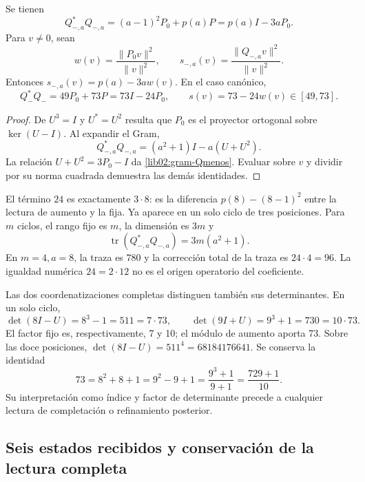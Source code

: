 \begin{theorem}
\label{lib02:gram-ternario}
Se tienen
\begin{equation}
 Q_{-,a}^*Q_{-,a}
 =(a-1)^2P_0+p(a)P=p(a)I-3aP_0.
 \label{lib02:gram-Qmenos}
\end{equation}
Para \(v\ne0\), sean
\[
 w(v)=\frac{\|P_0v\|^2}{\|v\|^2},\qquad
 s_{-,a}(v)=\frac{\|Q_{-,a}v\|^2}{\|v\|^2}.
\]
Entonces \(s_{-,a}(v)=p(a)-3aw(v)\). En el caso canónico,
\begin{equation}
 Q_-^*Q_-=49P_0+73P=73I-24P_0,
 \qquad s(v)=73-24w(v)\in[49,73].
 \label{lib02:73-24w}
\end{equation}
\end{theorem}
\begin{proof}
De \(U^3=I\) y \(U^*=U^2\) resulta que \(P_0\) es el
proyector ortogonal sobre \(\ker(U-I)\). Al expandir el Gram,
\[
 Q_{-,a}^*Q_{-,a}=(a^2+1)I-a(U+U^2).
\]
La relación \(U+U^2=3P_0-I\) da
\eqref{lib02:gram-Qmenos}. Evaluar sobre \(v\) y dividir por su
norma cuadrada demuestra las demás identidades.
\end{proof}

El término \(24\) es exactamente \(3\cdot8\): es la diferencia
\(p(8)-(8-1)^2\) entre la lectura de aumento y la fija. Ya aparece
en un solo ciclo de tres posiciones. Para \(m\) ciclos, el rango fijo
es \(m\), la dimensión es \(3m\) y
\[
 \operatorname{tr}(Q_{-,a}^*Q_{-,a})=3m(a^2+1).
\]
En \(m=4,a=8\), la traza es 780 y la corrección total de la traza
es \(24\cdot4=96\). La igualdad numérica \(24=2\cdot12\) no es
el origen operatorio del coeficiente.

Las dos coordenatizaciones completas distinguen también sus determinantes. En un
solo ciclo,
\[
 \det(8I-U)=8^3-1=511=7\cdot73,
 \qquad
 \det(9I+U)=9^3+1=730=10\cdot73.
\]
El factor fijo es, respectivamente, 7 y 10; el módulo de aumento aporta
73. Sobre las doce posiciones,
\(\det(8I-U)=511^4=68184176641\). Se conserva la identidad
\begin{equation}
 73=8^2+8+1=9^2-9+1=\frac{9^3+1}{9+1}
 =\frac{729+1}{10}.
 \label{lib02:completacion73}
\end{equation}
Su interpretación como índice y factor de determinante precede a
cualquier lectura de completación o refinamiento posterior.

\subsection{Seis estados recibidos y conservación de la lectura completa}
\label{lib02:seis-estados}

